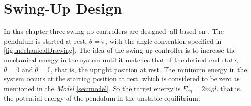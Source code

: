 \chapter{Swing-Up Design}\label{sec:swing-upDesign}
In this chapter three swing-up controllers are designed, all based on \cite{kjAastrom}. The pendulum is started at rest, $\theta = \pi$, with the angle convention specified in \autoref{fig:mechanicalDrawing}. The idea of the swing-up controller is to increase the mechanical energy in the system until it matches that of the desired end state, $\theta = 0$ and $\dot{\theta} = 0$, that is, the upright position at rest. The minimum energy in the system occurs at the starting position at rest, which is considered to be zero as mentioned in the \textit{Model} \autoref{sec:model}. So the target energy is $E_{\mathrm{eq}} = 2 m g l$, that is, the potential energy of the pendulum in the unstable equilibrium.

